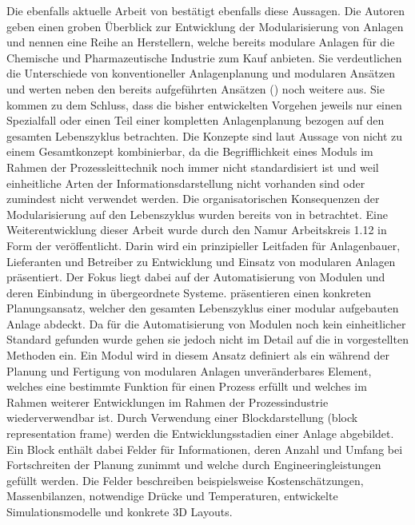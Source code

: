 Die ebenfalls aktuelle Arbeit  von \citeauthor{Hohmann_2017} \cite{Hohmann_2017} best\"atigt ebenfalls diese Aussagen. Die Autoren geben einen groben \"Uberblick zur Entwicklung der Modularisierung von Anlagen und nennen eine Reihe an Herstellern, welche bereits modulare Anlagen f\"ur die Chemische und Pharmazeutische Industrie  zum Kauf anbieten. \newline
Sie verdeutlichen die Unterschiede von konventioneller Anlagenplanung und modularen Ans\"atzen und werten neben den bereits aufgef\"uhrten Ans\"atzen (\cite{Bramsiepe_2012, Uzuner_2012, Hady_2012,Fleischer_2016}) noch weitere aus. Sie kommen zu dem Schluss, dass die bisher entwickelten Vorgehen jeweils nur einen Spezialfall oder einen Teil einer kompletten Anlagenplanung bezogen auf den gesamten Lebenszyklus betrachten. Die Konzepte sind laut Aussage von \citeauthor{Hohmann_2017} nicht zu einem Gesamtkonzept kombinierbar, da die Begrifflichkeit eines Moduls im Rahmen der Prozessleittechnik noch immer nicht standardisiert ist und weil einheitliche Arten der Informationsdarstellung nicht vorhanden sind oder zumindest nicht verwendet werden. \newline
Die organisatorischen Konsequenzen der Modularisierung auf den Lebenszyklus wurden bereits von \citeauthor{Obst_2013b} in \cite{Obst_2013b} betrachtet. Eine Weiterentwicklung dieser Arbeit wurde durch den Namur Arbeitskreis 1.12 in Form der  \cite{ne_148} ver\"offentlicht. Darin wird ein prinzipieller Leitfaden f\"ur Anlagenbauer, Lieferanten und Betreiber zu Entwicklung und Einsatz von modularen Anlagen pr\"asentiert. Der Fokus liegt dabei auf der Automatisierung von Modulen und deren Einbindung in \"ubergeordnete Systeme. \newline
\citeauthor{Hohmann_2017} pr\"asentieren einen konkreten Planungsansatz, welcher den gesamten Lebenszyklus einer modular aufgebauten Anlage abdeckt. Da f\"ur die Automatisierung von Modulen noch kein einheitlicher Standard gefunden wurde gehen sie jedoch nicht im Detail auf die in \cite{ne_148} vorgestellten Methoden ein. \newline
Ein Modul wird in diesem Ansatz definiert als \glqq ein w\"ahrend der Planung und Fertigung von modularen Anlagen unver\"anderbares Element, welches eine bestimmte Funktion f\"ur einen Prozess erf\"ullt und welches im Rahmen weiterer Entwicklungen im Rahmen der Prozessindustrie wiederverwendbar ist\grqq { }\cite[S. 2]{Hohmann_2017}. Durch Verwendung einer Blockdarstellung (\glqq block representation frame\grqq { }) werden die Entwicklungsstadien einer Anlage abgebildet. Ein Block enth\"alt dabei Felder f\"ur Informationen, deren Anzahl und Umfang bei Fortschreiten der Planung zunimmt und welche durch Engineeringleistungen gef\"ullt werden. Die Felder beschreiben beispielsweise Kostensch\"atzungen, Massenbilanzen, notwendige Dr\"ucke und Temperaturen, entwickelte Simulationsmodelle und konkrete 3D Layouts.

